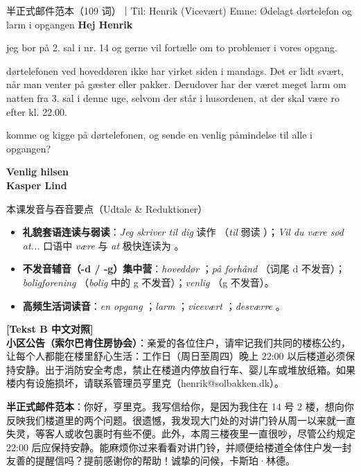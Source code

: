 \begin{emailbox}{半正式邮件范本（109 词）｜Til: Henrik (Vicevært) \quad Emne: Ødelagt dørtelefon og larm i opgangen}
\textbf{Hej Henrik}

 jeg bor på 2. sal i nr. 14 og gerne vil fortælle om to problemer i vores opgang.

 dørtelefonen ved hoveddøren ikke har virket siden i mandags. Det er lidt svært, når man venter på gæster eller pakker. Derudover har der været meget larm om natten fra 3. sal i denne uge, selvom der står i husordenen, at der skal være ro efter kl. 22.00.

 komme og kigge på dørtelefonen, og  sende en venlig påmindelse til alle i opgangen?


\textbf{Venlig hilsen}\\
\textbf{Kasper Lind}
\end{emailbox}

\begin{tipbox}{本课发音与吞音要点（Udtale \& Reduktioner）}
\begin{itemize}
  \item \textbf{礼貌套语连读与弱读}：\textit{Jeg skriver til dig} 读作 （\textit{til} 弱读 ）；\textit{Vil du være sød at...} 口语中 \textit{være} 与 \textit{at} 极快连读为 。
  \item \textbf{不发音辅音（-d / -g）集中营}：\textit{hoveddør} ；\textit{på forhånd} （词尾 d 不发音）；\textit{boligforening} （\textit{bolig} 中的 g 不发音）；\textit{venlig} （g 不发音）。
  \item \textbf{高频生活词读音}：\textit{en opgang} ；\textit{larm} ；\textit{vicevært} ；\textit{desværre} 。
\end{itemize}
\end{tipbox}

\begin{transbox}
\small
\textbf{\color{NCDTeal}[Tekst B 中文对照]}\\
\textbf{小区公告（索尔巴肯住房协会）}：亲爱的各位住户，请牢记我们共同的楼栋公约，让每个人都能在楼里舒心生活：工作日（周日至周四）晚上 22:00 以后楼道必须保持安静。出于消防安全考虑，禁止在楼道内停放自行车、婴儿车或堆放纸箱。如果楼内有设施损坏，请联系管理员亨里克（henrik@solbakken.dk）。

\textbf{半正式邮件范本}：你好，亨里克。我写信给你，是因为我住在 14 号 2 楼，想向你反映我们楼道里的两个问题。很遗憾，我发现大门处的对讲门铃从周一以来就一直失灵，等客人或收包裹时有些不便。此外，本周三楼夜里一直很吵，尽管公约规定 22:00 后应保持安静。能麻烦你过来看看对讲门铃，并顺便给楼道全体住户发一封友善的提醒信吗？提前感谢你的帮助！诚挚的问候，卡斯珀·林德。
\end{transbox}

